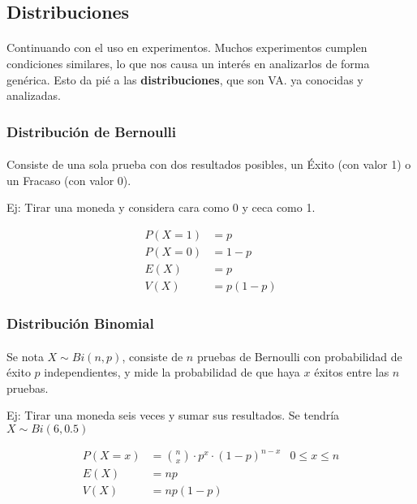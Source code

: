 \documentclass[../main.tex]{subfiles}
\begin{document}
\subsection{Distribuciones}

\paragraph{} Continuando con el uso en experimentos. Muchos experimentos cumplen condiciones similares, lo que nos causa un interés en analizarlos de forma genérica. Esto da pié a las \textbf{distribuciones}, que son VA. ya conocidas y analizadas.

\subsubsection{Distribución de Bernoulli}

\paragraph{} Consiste de una sola prueba con dos resultados posibles, un Éxito (con valor 1) o un Fracaso (con valor 0).

Ej: Tirar una moneda y considera cara como 0 y ceca como 1.

\begin{align*}
  P(X = 1) &= p \\
  P(X = 0) &= 1-p \\
  E(X) &= p \\
  V(X) &= p(1-p)
\end{align*}

\subsubsection{Distribución Binomial}

\paragraph{} Se nota \(X \sim Bi(n, p)\), consiste de \(n\) pruebas de Bernoulli con probabilidad de éxito \(p\) independientes, y mide la probabilidad de que haya \(x\) éxitos entre las \(n\) pruebas.

Ej: Tirar una moneda seis veces y sumar sus resultados. Se tendría \(X \sim Bi(6, 0.5)\)

\begin{align*}
  P(X = x) &= \binom{n}{x} \cdot p^{x} \cdot (1-p)^{n-x} & 0 \leq x \leq n \\
  E(X) &= np \\
  V(X) &= np(1-p)
\end{align*}
\end{document}
